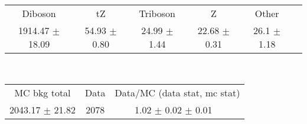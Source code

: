{\small
\begin{tabular}{cccccc}
\hline
Diboson & tZ & Triboson & Z & Other  \\
1914.47 $\pm$ 18.09 & 54.93 $\pm$ 0.80 & 24.99 $\pm$ 1.44 & 22.68 $\pm$ 0.31 & 26.1 $\pm$ 1.18 \\
\hline
\end{tabular}\\
\vspace{4mm}
\begin{tabular}{ccc}
\hline\hline
MC bkg total & Data & Data/MC (data stat, mc stat)\\
2043.17 $\pm$ 21.82 & 2078 & 1.02 $\pm$ 0.02 $\pm$ 0.01 \
\\
\hline\hline
\end{tabular}}\\